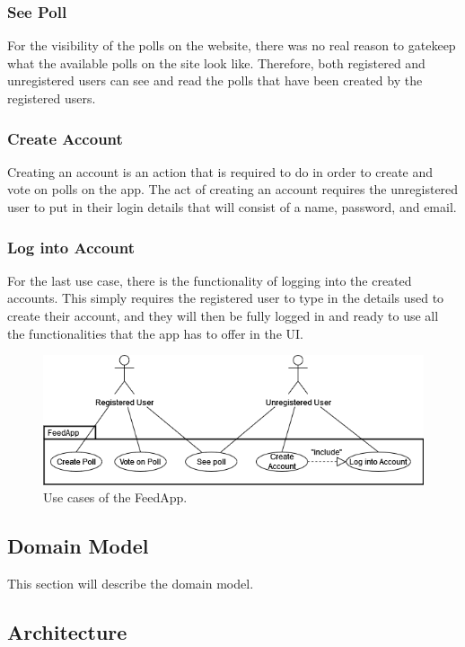 \subsubsection{See Poll}
For the visibility of the polls on the website, there was no real reason to gatekeep what the available polls on the site look like. Therefore, both registered and unregistered users can see and read the polls that have been created by the registered users.

\subsubsection{Create Account}
Creating an account is an action that is required to do in order to create and vote on polls on the app. The act of creating an account requires the unregistered user to put in their login details that will consist of a name, password, and email.

\subsubsection{Log into Account}
For the last use case, there is the functionality of logging into the created accounts. This simply requires the registered user to type in the details used to create their account, and they will then be fully logged in and ready to use all the functionalities that the app has to offer in the UI.

\begin{figure}[thb]
	\centering
	\includegraphics[scale=0.5]{figs/usecases.png}
	\caption{Use cases of the FeedApp.}
	\label{fig:usecases}
\end{figure}

\subsection{Domain Model}
This section will describe the domain model.

\subsection{Architecture}

